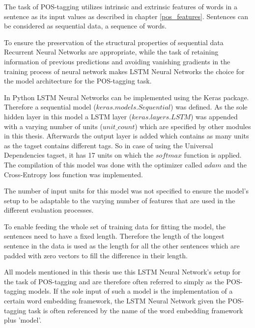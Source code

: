 The task of POS-tagging utilizes intrinsic and extrinsic features of words in a sentence as its input values as described in chapter \ref{pos_features}. Sentences can be considered as sequential data, a sequence of words.

To ensure the preservation of the structural properties of sequential data Recurrent Neural Networks are appropriate, while the task of retaining information of previous predictions and avoiding vanishing gradients in the training process of neural network makes LSTM Neural Networks the choice for the model architecture for the POS-tagging task.

In Python LSTM Neural Networks can be implemented using the Keras package. Therefore a sequential model ($keras.models.Sequential$) was defined. As the sole hidden layer in this model a LSTM layer ($keras.layers.LSTM$) was appended with a varying number of units ($unit\_count$) which are specified by other modules in this thesis. Afterwards the output layer is added which contains as many units as the tagset contains different tags. So in case of using the Universal Dependencies tagset, it has 17 units on which the $softmax$ function is applied. The compilation of this model was done with the optimizer called $adam$ and the Cross-Entropy loss function was implemented.

The number of input units for this model was not specified to ensure the model's setup to be adaptable to the varying number of features that are used in the different evaluation processes.

To enable feeding the whole set of training data for fitting the model, the sentences need to have a fixed length. Therefore the length of the longest sentence in the data is used as the length for all the other sentences which are padded with zero vectors to fill the difference in their length.

All models mentioned in this thesis use this LSTM Neural Network's setup for the task of POS-tagging and are therefore often referred to simply as the POS-tagging models. If the sole input of such a model is the implementation of a certain word embedding framework, the LSTM Neural Network given the POS-tagging task is often referenced by the name of the word embedding framework plus 'model'.
